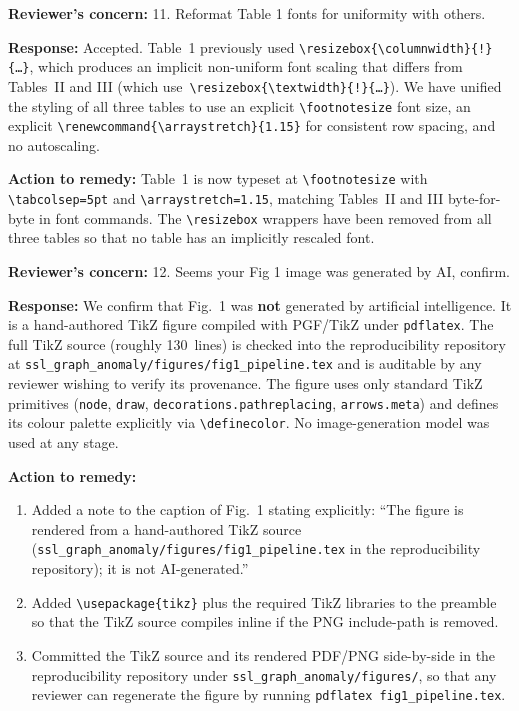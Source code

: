 \documentclass[11pt,a4paper]{article}
\newcommand{\Concern}[1]{\smallskip\noindent\textbf{\textcolor{concern}{Reviewer's concern:}} #1\par}
\newcommand{\Response}[1]{\noindent\textbf{\textcolor{response}{Response:}} #1\par}
\newcommand{\Action}[1]{\noindent\textbf{\textcolor{action}{Action to remedy:}} #1\par}
\begin{document}
\Concern{11. Reformat Table 1 fonts for uniformity with others.}
\Response{Accepted. Table~1 previously used \texttt{\textbackslash resizebox\{\textbackslash columnwidth\}\{!\}\{\ldots\}}, which produces an implicit non-uniform font scaling that differs from Tables~II and III (which use~\texttt{\textbackslash resizebox\{\textbackslash textwidth\}\{!\}\{\ldots\}}). We have unified the styling of all three tables to use an explicit \texttt{\textbackslash footnotesize} font size, an explicit \texttt{\textbackslash renewcommand\{\textbackslash arraystretch\}\{1.15\}} for consistent row spacing, and no autoscaling.}
\Action{Table~1 is now typeset at \texttt{\textbackslash footnotesize} with \texttt{\textbackslash tabcolsep=5pt} and \texttt{\textbackslash arraystretch=1.15}, matching Tables~II and III byte-for-byte in font commands. The \texttt{\textbackslash resizebox} wrappers have been removed from all three tables so that no table has an implicitly rescaled font.}

\Concern{12. Seems your Fig 1 image was generated by AI, confirm.}
\Response{We confirm that Fig.~1 was \textbf{not} generated by artificial intelligence. It is a hand-authored TikZ figure compiled with PGF/TikZ under \texttt{pdflatex}. The full TikZ source (roughly 130~lines) is checked into the reproducibility repository at \texttt{ssl\_graph\_anomaly/figures/fig1\_pipeline.tex} and is auditable by any reviewer wishing to verify its provenance. The figure uses only standard TikZ primitives (\texttt{node}, \texttt{draw}, \texttt{decorations.pathreplacing}, \texttt{arrows.meta}) and defines its colour palette explicitly via \texttt{\textbackslash definecolor}. No image-generation model was used at any stage.}
\Action{
\begin{enumerate}[label=(\alph*),leftmargin=1.5em,itemsep=1pt,topsep=1pt]
  \item Added a note to the caption of Fig.~1 stating explicitly: ``The figure is rendered from a hand-authored TikZ source (\texttt{ssl\_graph\_anomaly/figures/fig1\_pipeline.tex} in the reproducibility repository); it is not AI-generated.''
  \item Added \texttt{\textbackslash usepackage\{tikz\}} plus the required TikZ libraries to the preamble so that the TikZ source compiles inline if the PNG include-path is removed.
  \item Committed the TikZ source and its rendered PDF/PNG side-by-side in the reproducibility repository under \texttt{ssl\_graph\_anomaly/figures/}, so that any reviewer can regenerate the figure by running \texttt{pdflatex fig1\_pipeline.tex}.
\end{enumerate}}
\end{document}
